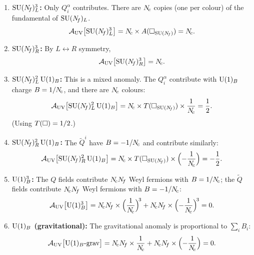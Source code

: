 \documentclass[11pt,a4paper]{article}
\begin{document}
\begin{enumerate}[label=(\arabic*)]
  \item \textbf{$\mathrm{SU}(N_{\!f})_L^3$:}
    Only $Q_i^\alpha$ contributes.
    There are $N_{\!c}$ copies (one per colour) of the fundamental of $\mathrm{SU}(N_{\!f})_L$.
    \begin{equation}
      \mathcal{A}_{\mathrm{UV}}\bigl[\mathrm{SU}(N_{\!f})_L^3\bigr]
      = N_{\!c} \times A(\square_{\mathrm{SU}(N_{\!f})}) = N_{\!c}.
      \label{eq:uv-sunfL3}
    \end{equation}

  \item \textbf{$\mathrm{SU}(N_{\!f})_R^3$:}
    By $L \leftrightarrow R$ symmetry,
    \begin{equation}
      \mathcal{A}_{\mathrm{UV}}\bigl[\mathrm{SU}(N_{\!f})_R^3\bigr] = N_{\!c}.
      \label{eq:uv-sunfR3}
    \end{equation}

  \item \textbf{$\mathrm{SU}(N_{\!f})_L^2 \,\mathrm{U}(1)_B$:}
    This is a mixed anomaly.  The $Q_i^\alpha$ contribute with
    $\mathrm{U}(1)_B$ charge $B = 1/N_{\!c}$, and there are $N_{\!c}$ colours:
    \begin{equation}
      \mathcal{A}_{\mathrm{UV}}\bigl[\mathrm{SU}(N_{\!f})_L^2\,\mathrm{U}(1)_B\bigr]
      = N_{\!c} \times T(\square_{\mathrm{SU}(N_{\!f})}) \times \frac{1}{N_{\!c}}
      = \frac{1}{2}.
      \label{eq:uv-sunfL2-u1b}
    \end{equation}
    (Using $T(\square) = 1/2$.)

  \item \textbf{$\mathrm{SU}(N_{\!f})_R^2 \,\mathrm{U}(1)_B$:}
    The $\widetilde{Q}^i$ have $B = -1/N_{\!c}$ and contribute similarly:
    \begin{equation}
      \mathcal{A}_{\mathrm{UV}}\bigl[\mathrm{SU}(N_{\!f})_R^2\,\mathrm{U}(1)_B\bigr]
      = N_{\!c} \times T(\square_{\mathrm{SU}(N_{\!f})}) \times \Bigl(-\frac{1}{N_{\!c}}\Bigr)
      = -\frac{1}{2}.
      \label{eq:uv-sunfR2-u1b}
    \end{equation}

  \item \textbf{$\mathrm{U}(1)_B^3$:}
    The $Q$ fields contribute $N_{\!c} N_{\!f}$ Weyl fermions with $B = 1/N_{\!c}$;
    the $\widetilde{Q}$ fields contribute $N_{\!c} N_{\!f}$ Weyl fermions with
    $B = -1/N_{\!c}$:
    \begin{equation}
      \mathcal{A}_{\UV}\bigl[\UU{1}_B^3\bigr]
      = \Nc\Nf \times \Bigl(\frac{1}{\Nc}\Bigr)^{\!3}
      + \Nc\Nf \times \Bigl(-\frac{1}{\Nc}\Bigr)^{\!3}
      = 0.
      \label{eq:uv-u1b3}
    \end{equation}

  \item \textbf{$\mathrm{U}(1)_B$ (gravitational):}
    The gravitational anomaly is proportional to $\sum_i B_i$:
    \begin{equation}
      \mathcal{A}_{\mathrm{UV}}\bigl[\mathrm{U}(1)_B\text{-grav}\bigr]
      = N_{\!c}N_{\!f} \times \frac{1}{N_{\!c}}
      + N_{\!c}N_{\!f} \times \Bigl(-\frac{1}{N_{\!c}}\Bigr)
      = 0.
      \label{eq:uv-u1b-grav}
    \end{equation}
\end{enumerate}
\end{document}
